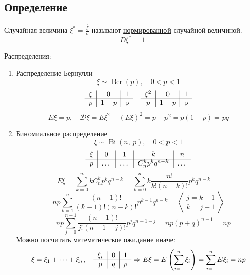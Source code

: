\documentclass[12pt, a4paper]{article}
\begin{document}
    \subsection*{Определение}
    Случайная величина $\xi^* = \frac{\overset{\circ}{\xi}}{\sigma}$ называют \underline{нормированной} случайной величиной.
    \[D\xi^* = 1\]
    \begin{center}
        Распределения:
    \end{center}
    \begin{enumerate}
        \item Распределение Бернулли
        \[\xi \sim \operatorname{Ber}(p),\quad 0 < p < 1\]
        \[\begin{tabular}{c|c|c}
            $\xi$ & $0$ & $1$\\
            \hline
            $p$ & $1 - p$ & p
        \end{tabular}\quad \begin{tabular}{c|c|c}
            $\xi^2$ & $0$ & $1$\\
            \hline
            $p$ & $1 - p$ & p
        \end{tabular}\]
        \[E\xi = p,\quad \mathcal{D}\xi = E\xi^2 - (E\xi)^2 = p - p^2 = p(1 - p) = pq\]
        \item Биномиальное распределение
        \[\xi \sim \operatorname{Bi}(n,\ p),\quad 0 < p < 1\]
        \[\begin{tabular}{c|c|c|c|c}
            $\xi$ & $0$ & $1$ & $k$ & $n$\\
            \hline
            $p$ & $\dots$ & $\dots$ & $C_n^kp^k q^{n - k}$ & $\dots$
        \end{tabular}\]
        \[E\xi = \sum_{k = 0}^{n}kC_n^k p^k q^{n - k} = \sum_{k = 0}^{n} k\frac{n!}{k!(n - k)!}p^k q^{n - k} =\]
        \[= np\sum_{k = 1}^{n} \frac{(n - 1)!}{( k - 1)!(n - k)!} p^{k - 1}q^{n - k} = \left< \begin{matrix}
            j = k - 1\\
            k = j + 1
        \end{matrix} \right> =\]
        \[=np\sum_{j = 0}^{n - 1} \frac{(n - 1)!}{j!(n - 1 - j)!} p^j q^{n - 1 - j} = np(p + q)^{n - 1} = np\]
        Можно посчитать математическое ожидание иначе:
        \[\xi = \xi_1 + \dots + \xi_n,\quad \begin{tabular}{c|c|c}
            $\xi_i$ & 0 & 1\\
            \hline
            p & $q$ & $p$
        \end{tabular}\Rightarrow E\xi = E\left(\sum\limits_{i = 1}^{n} \xi_i\right) = \sum\limits_{i = 1}^{n} E\xi_i = np\]

\end{enumerate}
\end{document}
